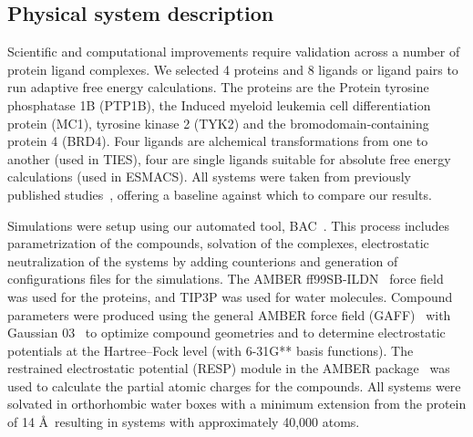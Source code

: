 \subsection{Physical system description}

Scientific and computational improvements require validation across a number
of protein ligand complexes. We selected 4 proteins and 8 ligands or ligand
pairs to run adaptive free energy calculations. The proteins are the Protein
tyrosine phosphatase 1B (PTP1B), the Induced myeloid leukemia cell
differentiation protein (MC1), tyrosine kinase 2 (TYK2) and the
bromodomain-containing protein 4 (BRD4). Four ligands are alchemical
transformations from one to another (used in TIES), four are single ligands
suitable for absolute free energy calculations (used in ESMACS). All systems
were taken from previously published studies~\cite{}, offering a baseline against which to compare our results.

Simulations were setup using our automated tool, BAC~\cite{Sadiq2008}. This
process includes parametrization of the compounds, solvation of the
complexes, electrostatic neutralization of the systems by adding counterions
and generation of configurations files for the simulations. The AMBER
ff99SB-ILDN~\cite{Lindorff-Larsen2010} force field was used for the proteins,
and TIP3P was used for water molecules. Compound parameters were produced
using the general AMBER force field (GAFF)~\cite{Wang2004} with Gaussian
03~\cite{Frisch} to optimize compound geometries and to determine
electrostatic potentials at the Hartree–Fock level (with 6-31G** basis
functions). The restrained electrostatic potential (RESP) module in the AMBER
package~\cite{Case2005} was used to calculate the partial atomic charges for
the compounds. All systems were solvated in orthorhombic water boxes with a
minimum extension from the protein of 14 \AA\, resulting in systems with
approximately 40,000 atoms.

